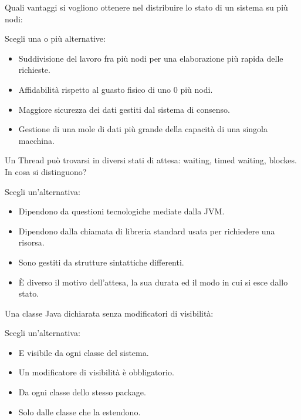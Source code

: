 \documentclass{article}
\begin{document}
Quali vantaggi si vogliono ottenere nel distribuire lo stato di un sistema su più nodi:

Scegli una o più alternative:

\begin{itemize}
	\item Suddivisione del lavoro fra più nodi per una elaborazione più rapida delle richieste.
	\item \checkmark Affidabilità rispetto al guasto fisico di uno 0 più nodi.
	\item Maggiore sicurezza dei dati gestiti dal sistema di consenso.
	\item \checkmark Gestione di una mole di dati più grande della capacità di una singola macchina. 
\end{itemize}

Un Thread può trovarsi in diversi stati di attesa: waiting, timed waiting, blockes. In cosa si distinguono?

Scegli un'alternativa: 

\begin{itemize}
	\item Dipendono da questioni tecnologiche mediate dalla JVM.
	\item Dipendono dalla chiamata di libreria standard usata per richiedere una risorsa.
	\item Sono gestiti da strutture sintattiche differenti.
	\item \checkmark È diverso il motivo dell'attesa, la sua durata ed il modo in cui si esce dallo stato.
\end{itemize}

Una classe Java dichiarata senza modificatori di visibilità:

Scegli un'alternativa: 

\begin{itemize}
	\item E visibile da ogni classe del sistema.
	\item Un modificatore di visibilità è obbligatorio.
	\item \checkmark Da ogni classe dello stesso package.
	\item Solo dalle classe che la estendono.
\end{itemize}
\end{document}
